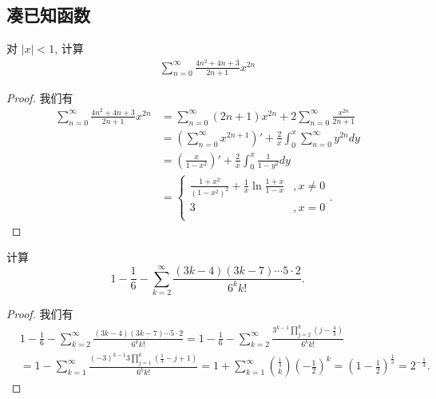\documentclass[../../main.tex]{subfiles}
\begin{document}
\subsection{凑已知函数}

\begin{example}
对 \(|x| < 1\), 计算
\begin{align*}
\sum_{n=0}^{\infty} \frac{4n^2 + 4n + 3}{2n + 1} x^{2n}
\end{align*}
\end{example}
\begin{proof}
我们有
\begin{align*}
\sum_{n=0}^{\infty} \frac{4n^2 + 4n + 3}{2n + 1} x^{2n} &= \sum_{n=0}^{\infty} (2n + 1) x^{2n} + 2 \sum_{n=0}^{\infty} \frac{x^{2n}}{2n + 1} \\
&= \left( \sum_{n=0}^{\infty} x^{2n + 1} \right)' + \frac{2}{x} \int_{0}^{x} \sum_{n=0}^{\infty} y^{2n} dy \\
&= \left( \frac{x}{1 - x^2} \right)' + \frac{2}{x} \int_{0}^{x} \frac{1}{1 - y^2} dy \\
&=\begin{cases}
\frac{1+x^2}{(1-x^2)^2}+\frac{1}{x}\ln \frac{1+x}{1-x}&,x\ne 0\\
3&,x=0\\
\end{cases}.
\end{align*}
\end{proof}

\begin{example}
计算
\[
1 - \frac{1}{6} - \sum_{k=2}^{\infty} \frac{(3k - 4)(3k - 7) \cdots 5 \cdot 2}{6^k k!}.
\]
\end{example}
\begin{proof}
我们有
\begin{align*}
&1 - \frac{1}{6} - \sum_{k=2}^{\infty} \frac{(3k - 4)(3k - 7) \cdots 5 \cdot 2}{6^k k!}= 1 - \frac{1}{6} - \sum_{k=2}^{\infty} \frac{3^{k - 1} \prod\limits_{j=2}^{k} \left(j - \frac{4}{3}\right)}{6^k k!}\\
&= 1 - \sum_{k=1}^{\infty} \frac{(-3)^{k - 1} 3 \prod\limits_{j=1}^{k} \left(\frac{1}{3} - j + 1\right)}{6^k k!}= 1 + \sum_{k=1}^{\infty} \binom{\frac{1}{3}}{k} \left(-\frac{1}{2}\right)^k = \left(1 - \frac{1}{2}\right)^{\frac{1}{3}} = 2^{-\frac{1}{3}}.
\end{align*}
\end{proof}
\end{document}
